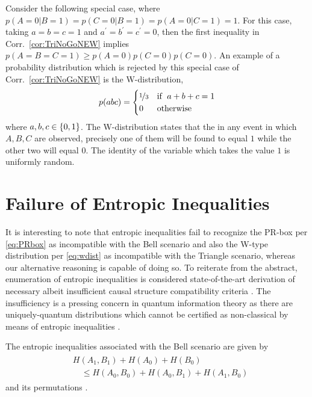 Consider the following special case, where ${p(A\mathopen{=}0|B\mathopen{=}1)}={p(C\mathopen{=}0|B\mathopen{=}1)}={p(A\mathopen{=}0|C\mathopen{=}1)}=1$. For this case, taking ${a\mathopen{=}b\mathopen{=}c\mathopen{=}1}$ and ${a^{\prime}\mathopen{=}b^{\prime}\mathopen{=}c^{\prime}\mathopen{=}0}$, then the first inequality in Corr.~\ref{cor:TriNoGoNEW} implies $p(A\mathopen{=}B\mathopen{=}C\mathopen{=}1)\geq p(A\mathopen{=}0)p(C\mathopen{=}0)p(C\mathopen{=}0)$.
An example of a probability distribution which is rejected by this special case of Corr.~\ref{cor:TriNoGoNEW} is the W-distribution, 
\begin{align}\label{eq:wdist}
p(abc)=\begin{cases}\nicefrac{1}{3}&\text{if }\; a+b+c=1 \\ 0&\text{otherwise}\end{cases}
\end{align}
where $a,b,c\in\lbrace{0,1\rbrace}$. The W-distribution states that the in any event in which $A,B,C$ are observed, precisely one of them will be found to equal $1$ while the other two will equal $0$. The identity of the variable which takes the value $1$ is uniformly random. 






\section{Failure of Entropic Inequalities}

It is interesting to note that entropic inequalities \cite{fritz2013marginal,chaves2014novel} fail to recognize the PR-box per \cref{eq:PRbox} as incompatible with the Bell scenario and also the W-type distribution per \cref{eq:wdist} as incompatible with the Triangle scenario, whereas our alternative reasoning is capable of doing so. To reiterate from the abstract, enumeration of entropic inequalities is considered state-of-the-art derivation of necessary albeit insufficient causal structure compatibility criteria \cite{pusey2014gdag}. The insufficiency is a pressing concern in quantum information theory as there are uniquely-quantum distributions which cannot be certified as non-classical by means of entropic inequalities \cite{fritz2012bell}. 

The entropic inequalities associated with the Bell scenario are given by
\begin{align}\begin{split}\label{eq:entropicCHSH}
&H\!\left(A_1,B_1\right)+H\!\left(A_0\right)+H\!\left(B_0\right)
\\&\quad\leq H\!\left(A_0,B_0\right)+H\!\left(A_0,B_1\right)+H\!\left(A_1,B_0\right)
\end{split}\end{align}
and its permutations \cite{chaves2014novel,chaves2012entropic}.

